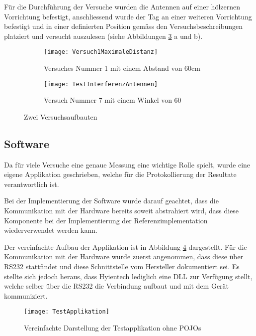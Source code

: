 Für die Durchführung der Versuche wurden die Antennen auf einer hölzernen Vorrichtung befestigt, anschliessend wurde der Tag an einer weiteren Vorrichtung befestigt und in einer definierten Position gemäss den Versuchsbeschreibungen platziert und versucht auszulesen (siehe Abbildungen \ref{fig:versuchsaufbauten} a und b).

\begin{figure}[htb]
	\begin{subfigure}{.5\linewidth}
		\texttt{[image: Versuch1MaximaleDistanz]}
		\caption{Versuches Nummer 1 mit einem Abstand von 60cm}
		\label{fig:versuchaufbaunmr1}
	\end{subfigure}\hfill%
	\begin{subfigure}{.35\linewidth}
		\centering
		\texttt{[image: TestInterferenzAntennen]}
		\caption{Versuch Nummer 7 mit einem Winkel von 60\SIUnitSymbolDegree}
		\label{fig:versuchaufbaunmr7}
	\end{subfigure}
	\caption{Zwei Versuchsaufbauten}
	\label{fig:versuchsaufbauten}
\end{figure}


\subsection{Software}
Da für viele Versuche eine genaue Messung eine wichtige Rolle spielt, wurde eine eigene Applikation geschrieben, welche für die Protokollierung der Resultate verantwortlich ist.

Bei der Implementierung der Software wurde darauf geachtet, dass die Kommunikation mit der Hardware bereits soweit abstrahiert wird, dass diese Komponente bei der Implementierung der Referenzimplementation wiederverwendet werden kann.

Der vereinfachte Aufbau der Applikation ist in Abbildung \ref{fig:test_applikation_aufbau} dargestellt. Für die Kommunikation mit der Hardware wurde zuerst angenommen, dass diese über RS232 stattfindet und diese Schnittstelle vom Hersteller dokumentiert sei. Es stellte sich jedoch heraus, dass Hyientech lediglich eine DLL zur Verfügung stellt, welche selber über die RS232 die Verbindung aufbaut und mit dem Gerät kommuniziert. \nocite{hyintech2019dll}

\begin{figure}[htb]
	\centering
	\texttt{[image: TestApplikation]}
	\caption{Vereinfachte Darstellung der Testapplikation ohne POJOs}
	\label{fig:test_applikation_aufbau}
\end{figure}
 
